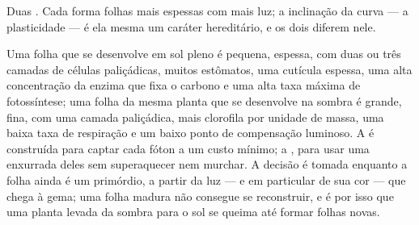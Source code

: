 \begin{omfigure}

{\small Duas . Cada  forma folhas mais espessas
com mais luz; a inclinação da curva --- a plasticidade --- é ela mesma
um caráter hereditário, e os dois  diferem nele.}
\end{omfigure}

\begin{proposition}\label{prop:b2:plant-plasticity:sunshade}
Uma folha que se desenvolve em sol pleno é pequena, espessa, com duas
ou três camadas de células paliçádicas, muitos estômatos, uma cutícula
espessa, uma alta concentração da enzima que fixa o carbono e uma alta
taxa máxima de fotossíntese; uma folha da mesma planta que se
desenvolve na sombra é grande, fina, com uma camada paliçádica, mais
clorofila por unidade de massa, uma baixa taxa de respiração e um
baixo ponto de compensação luminoso. A  é construída
para captar cada fóton a um custo mínimo; a , para usar uma
enxurrada deles sem superaquecer nem murchar. A decisão é tomada
enquanto a folha ainda é um primórdio, a partir da luz --- e em
particular de sua cor --- que chega à gema; uma folha madura não
consegue se reconstruir, e é por isso que uma planta levada da sombra
para o sol se queima até formar folhas novas.
\end{proposition}

